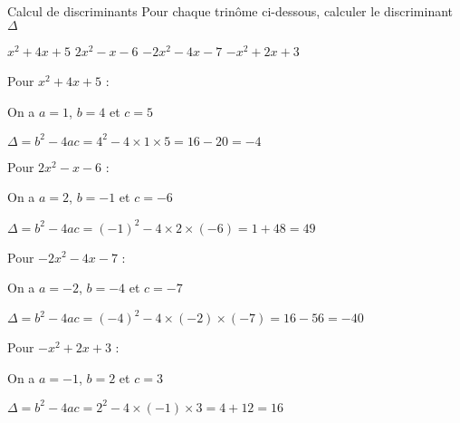 
\def\rdifficulty{1}
\begin{EXO}{Calcul de discriminants}{}
Pour chaque trinôme ci-dessous, calculer le discriminant $\Delta$
\begin{tcbenumerate}[4]
\tcbitem {} $x^2+4x+5$
\tcbitem {} $2x^2-x-6$
\tcbitem {} $-2x^2-4x-7$
\tcbitem {} $-x^2+2x+3$ \\
\end{tcbenumerate}

\exocorrection

\begin{tcbenumerate}[2]
\tcbitem Pour $x^2+4x+5$ :

On a $a=1$, $b=4$ et $c=5$

$\Delta = b^2-4ac = 4^2-4\times1\times5 = 16-20 = -4$

\tcbitem Pour $2x^2-x-6$ :

On a $a=2$, $b=-1$ et $c=-6$

$\Delta = b^2-4ac = (-1)^2-4\times2\times(-6) = 1+48 = 49$

\tcbitem Pour $-2x^2-4x-7$ :

On a $a=-2$, $b=-4$ et $c=-7$

$\Delta = b^2-4ac = (-4)^2-4\times(-2)\times(-7) = 16-56 = -40$

\tcbitem Pour $-x^2+2x+3$ :

On a $a=-1$, $b=2$ et $c=3$

$\Delta = b^2-4ac = 2^2-4\times(-1)\times3 = 4+12 = 16$
\end{tcbenumerate}
\end{EXO}

